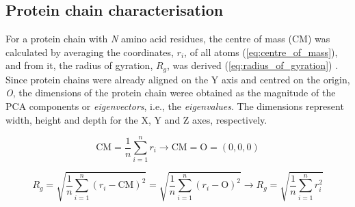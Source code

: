 \subsection{Protein chain characterisation}

For a protein chain with \textit{N} amino acid residues, the centre of mass (CM) was calculated by averaging the coordinates, $r_{i}$, of all atoms (\autoref{eq:centre_of_mass}), and from it, the radius of gyration, $R_{g}$, was derived (\autoref{eq:radius_of_gyration}) \cite{FIXMAN_1962_ROG}. Since protein chains were already aligned on the Y axis and centred on the origin, \textit{O}, the dimensions of the protein chain weree obtained as the magnitude of the PCA components or \textit{eigenvectors}, i.e., the \textit{eigenvalues}. The dimensions represent width, height and depth for the X, Y and Z axes, respectively.

\begin{equation}
\text{CM} = \frac{1}{n} \sum_{i=1}^{n} r_i \rightarrow \text{CM} = \text{O} = (0,0,0)
\label{eq:centre_of_mass}
\end{equation}

\vspace{-12pt} %
\vspace{-6pt} %

\begin{equation}
R_g = \sqrt{\frac{1}{n} \sum_{i=1}^{n} (r_i - \text{CM})^2} = \sqrt{\frac{1}{n} \sum_{i=1}^{n} (r_i - \text{O})^2} \rightarrow R_g = \sqrt{\frac{1}{n} \sum_{i=1}^{n} r_i^2}
\label{eq:radius_of_gyration}
\end{equation}

